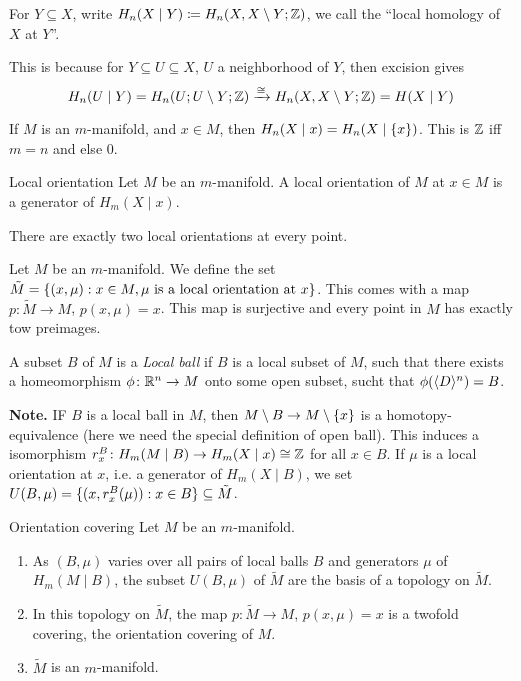 \documentclass[language=english]{TemplateLecture}
\begin{document}
\begin{notation}
For \(Y \subseteq X\), write \(H_n(X \mid Y)\coloneq H_n(X, X\setminus Y; \mathbb{Z})\), we call the \enquote{local homology of \(X\) at \(Y\)}.

This is because for \(Y \subseteq U \subseteq X\), \(U\) a neighborhood of \(Y\), then excision gives
\[H_n(U \mid Y) = H_n(U ; U\setminus Y; \mathbb{Z}) \xrightarrow{\cong} H_n(X, X\setminus Y; \mathbb{Z}) = H(X \mid Y)\]
\end{notation}

If \(M\) is an \(m\)-manifold, and \(x \in M\), then \(H_n(X \mid x) = H_n(X \mid \{x\})\). This is \(\mathbb{Z}\) iff \(m = n\) and else \(0\).

\begin{defi}{Local orientation}{}
    Let \(M\) be an \(m\)-manifold. A local orientation of \(M\) at  \(x \in M\) is a generator of \(H_m(X \mid x)\).
\end{defi}

There are exactly two local orientations at every point.

\begin{construction}
    Let \(M\) be an \(m\)-manifold. We define the set \(\tilde M = \{(x, \mu) : x \in M, \mu \text{ is a local orientation at } x\}\). This comes with a map \(p \colon \tilde M \to M\), \(p(x, \mu) = x\). This map is surjective and every point in \(M\) has exactly tow preimages.

    A subset \(B\) of \(M\) is a \emph{Local ball} if \(B\) is a local subset of \(M\), such that there exists a homeomorphism \(\phi \colon \mathbb{R}^n \to M\) onto some open subset, sucht that \(\phi(\langle D\rangle^n) = B\).

    \textbf{Note.} IF \(B\) is a local ball in \(M\), then \(M\setminus B \to M \setminus \{x\}\) is a homotopy-equivalence (here we need the special definition of open ball). This induces a isomorphism \(r_x^B\colon H_m(M \mid B) \to H_m(X \mid x) \cong \mathbb{Z}\) for all \(x \in B\).
    If \(\mu\) is a local orientation at \(x\), i.e. a generator of \(H_m(X \mid B)\), we set \(U(B, \mu) = \{(x, r_x^B(\mu)) : x \in B\} \subseteq \tilde M\).
\end{construction}

\begin{thm}{Orientation covering}{}
    Let \(M\) be an \(m\)-manifold.
    \begin{enumerate}
        \item As \((B, \mu)\) varies over all pairs of local balls \(B\) and generators \(\mu\) of \(H_m(M \mid B)\), the subset \(U(B, \mu)\) of \(\tilde M\) are the basis of a topology on \(\tilde M\).
        \item In this topology on \(\tilde M\), the map \(p \colon \tilde M \to M\), \(p(x, \mu) = x\) is a twofold covering, the orientation covering of \(M\). 
        \item \(\tilde M\) is an \(m\)-manifold.
    \end{enumerate}
\end{thm}
\end{document}

